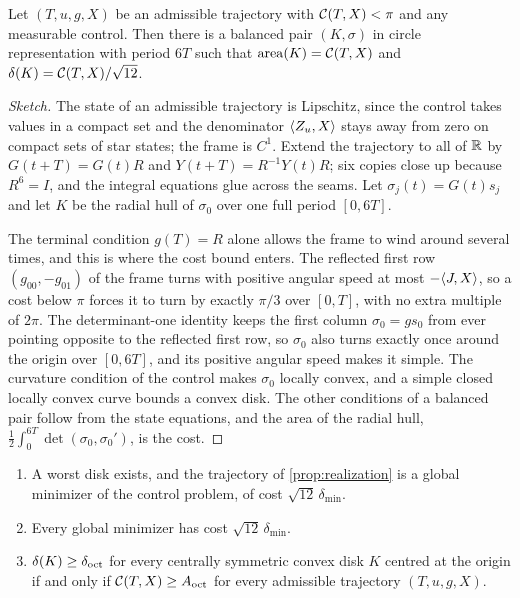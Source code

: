 \begin{proposition}\label{prop:reverse-comparison}
Let $(T,u,g,X)$ be an admissible trajectory with $\mathcal{C}(T,X)<\pi$ and any measurable control.
Then there is a balanced pair $(K,\sigma)$ in circle representation with period $6T$ such that
$\operatorname{area}(K)=\mathcal{C}(T,X)$ and $\delta(K)=\mathcal{C}(T,X)/\sqrt{12}$.
\end{proposition}

\begin{proof}[Sketch]
The state of an admissible trajectory is Lipschitz, since the control takes values in a compact set
and the denominator $\langle Z_u,X\rangle$ stays away from zero on compact sets of star states; the frame is
$C^1$. Extend the trajectory to all of $\mathbb{R}$ by $G(t+T)=G(t)R$ and $Y(t+T)=R^{-1}Y(t)R$; six copies
close up because $R^6=I$, and the integral equations glue across the seams. Let
$\sigma_j(t)=G(t)s_j$ and let $K$ be the radial hull of $\sigma_0$ over one full period $[0,6T]$.

The terminal condition $g(T)=R$ alone allows the frame to wind around several times, and this is
where the cost bound enters. The reflected first row $(g_{00},-g_{01})$ of the frame turns with
positive angular speed at most $-\langle J,X\rangle$, so a cost below $\pi$ forces it to turn by exactly
$\pi/3$ over $[0,T]$, with no extra multiple of $2\pi$. The determinant-one identity keeps the first
column $\sigma_0=gs_0$ from ever pointing opposite to the reflected first row, so $\sigma_0$ also
turns exactly once around the origin over $[0,6T]$, and its positive angular speed makes it simple.
The curvature condition of the control makes $\sigma_0$ locally convex, and a simple closed locally
convex curve bounds a convex disk. The other conditions of a balanced pair follow from the state
equations, and the area of the radial hull, $\tfrac12\int_0^{6T}\det(\sigma_0,\sigma_0')$, is the
cost.
\end{proof}

\begin{theorem}[Equivalence]\label{thm:equivalence}
\begin{enumerate}[label=\textup{(\roman*)}]
\item A worst disk exists, and the trajectory of \cref{prop:realization} is a global minimizer of
the control problem, of cost $\sqrt{12}\,\delta_{\min}$.
\item Every global minimizer has cost $\sqrt{12}\,\delta_{\min}$.
\item $\delta(K)\ge\delta_{\mathrm{oct}}$ for every centrally symmetric convex disk $K$ centred at the origin if
and only if $\mathcal{C}(T,X)\ge A_{\mathrm{oct}}$ for every admissible trajectory $(T,u,g,X)$.
\end{enumerate}
\end{theorem}

